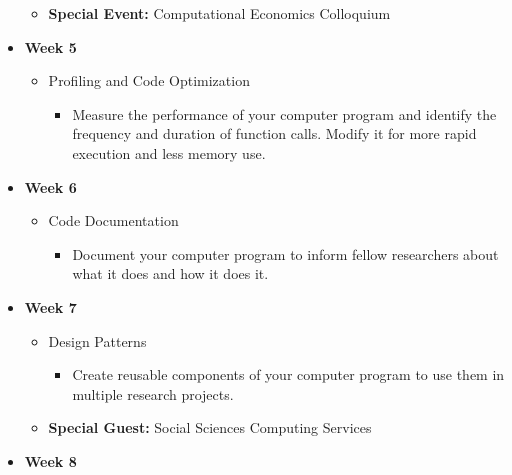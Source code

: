 \begin{itemize}
\begin{itemize}
\begin{itemize}
		\end{itemize}
	\item \textbf{Special Event:} Computational Economics Colloquium
	\end{itemize}
\item \textbf{Week 5} 
	\begin{itemize}
	\item  Profiling and Code Optimization
		\begin{itemize}
		\item Measure the performance of your computer program and identify the frequency and duration of function calls. Modify it for more rapid execution and less memory use.
		\end{itemize}
	\end{itemize}
\item \textbf{Week 6} 
	\begin{itemize}
	\item Code Documentation
		\begin{itemize}
		\item Document your computer program to inform fellow researchers about what it does and how it does it.
		\end{itemize}
	\end{itemize}
\item \textbf{Week 7} 
	\begin{itemize}
	\item Design Patterns
		\begin{itemize}
		\item Create reusable components of your computer program to use them in multiple research projects.
		\end{itemize}
	\item \textbf{Special Guest:} Social Sciences Computing Services
	\end{itemize}
\item \textbf{Week 8} 

\end{itemize}
